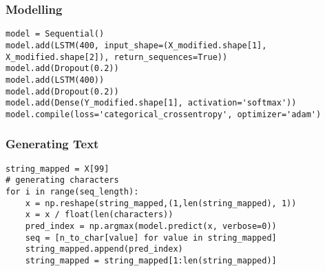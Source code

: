 \begin{frame}[fragile]
  \frametitle{Modelling}
  	  
\begin{lstlisting}
model = Sequential()
model.add(LSTM(400, input_shape=(X_modified.shape[1], X_modified.shape[2]), return_sequences=True))
model.add(Dropout(0.2))
model.add(LSTM(400))
model.add(Dropout(0.2))
model.add(Dense(Y_modified.shape[1], activation='softmax'))
model.compile(loss='categorical_crossentropy', optimizer='adam')
\end{lstlisting}  	  

 \end{frame} 
  
\begin{frame}[fragile]
  \frametitle{Generating Text}
\begin{lstlisting}
string_mapped = X[99]
# generating characters
for i in range(seq_length):
    x = np.reshape(string_mapped,(1,len(string_mapped), 1))
    x = x / float(len(characters))
    pred_index = np.argmax(model.predict(x, verbose=0))
    seq = [n_to_char[value] for value in string_mapped]
    string_mapped.append(pred_index)
    string_mapped = string_mapped[1:len(string_mapped)]
\end{lstlisting}  	  

 \end{frame}  
 
 
